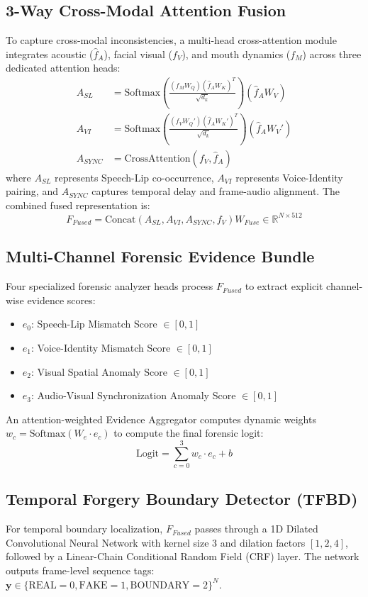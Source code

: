 \documentclass[conference]{IEEEtran}
\begin{document}
\subsection{3-Way Cross-Modal Attention Fusion}
To capture cross-modal inconsistencies, a multi-head cross-attention module integrates acoustic ($\hat{f}_A$), facial visual ($f_V$), and mouth dynamics ($f_M$) across three dedicated attention heads:
\begin{align}
A_{SL} &= \text{Softmax}\left(\frac{(f_M W_Q)(\hat{f}_A W_K)^T}{\sqrt{d_k}}\right) (\hat{f}_A W_V) \\
A_{VI} &= \text{Softmax}\left(\frac{(f_V W_Q')(\hat{f}_A W_K')^T}{\sqrt{d_k}}\right) (\hat{f}_A W_V') \\
A_{SYNC} &= \text{CrossAttention}(f_V, \hat{f}_A)
\end{align}
where $A_{SL}$ represents Speech-Lip co-occurrence, $A_{VI}$ represents Voice-Identity pairing, and $A_{SYNC}$ captures temporal delay and frame-audio alignment. The combined fused representation is:
\begin{equation}
F_{Fused} = \text{Concat}(A_{SL}, A_{VI}, A_{SYNC}, f_V) W_{Fuse} \in \mathbb{R}^{N \times 512}
\end{equation}

\subsection{Multi-Channel Forensic Evidence Bundle}
Four specialized forensic analyzer heads process $F_{Fused}$ to extract explicit channel-wise evidence scores:
\begin{itemize}
    \item $e_0$: Speech-Lip Mismatch Score $\in [0, 1]$
    \item $e_1$: Voice-Identity Mismatch Score $\in [0, 1]$
    \item $e_2$: Visual Spatial Anomaly Score $\in [0, 1]$
    \item $e_3$: Audio-Visual Synchronization Anomaly Score $\in [0, 1]$
\end{itemize}
An attention-weighted Evidence Aggregator computes dynamic weights $w_c = \text{Softmax}(W_e \cdot e_c)$ to compute the final forensic logit:
\begin{equation}
\text{Logit} = \sum_{c=0}^3 w_c \cdot e_c + b
\end{equation}

\subsection{Temporal Forgery Boundary Detector (TFBD)}
For temporal boundary localization, $F_{Fused}$ passes through a 1D Dilated Convolutional Neural Network with kernel size 3 and dilation factors $[1, 2, 4]$, followed by a Linear-Chain Conditional Random Field (CRF) layer. The network outputs frame-level sequence tags: $\mathbf{y} \in \{\text{REAL}=0, \text{FAKE}=1, \text{BOUNDARY}=2\}^N$.
\end{document}
